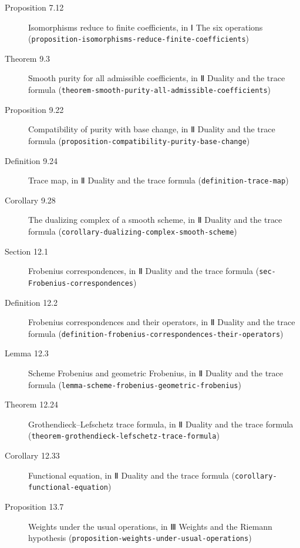 \documentclass[11pt]{article}
\newcommand{\bpslug}[1]{\texttt{#1}}
\begin{document}
\begin{description}
\item[Proposition 7.12] Isomorphisms reduce to finite coefficients, in Ⅰ The six operations (\bpslug{proposition-{}\allowbreak{}isomorphisms-{}\allowbreak{}reduce-{}\allowbreak{}finite-{}\allowbreak{}coefficients})
\item[Theorem 9.3] Smooth purity for all admissible coefficients, in Ⅱ Duality and the trace formula (\bpslug{theorem-{}\allowbreak{}smooth-{}\allowbreak{}purity-{}\allowbreak{}all-{}\allowbreak{}admissible-{}\allowbreak{}coefficients})
\item[Proposition 9.22] Compatibility of purity with base change, in Ⅱ Duality and the trace formula (\bpslug{proposition-{}\allowbreak{}compatibility-{}\allowbreak{}purity-{}\allowbreak{}base-{}\allowbreak{}change})
\item[Definition 9.24] Trace map, in Ⅱ Duality and the trace formula (\bpslug{definition-{}\allowbreak{}trace-{}\allowbreak{}map})
\item[Corollary 9.28] The dualizing complex of a smooth scheme, in Ⅱ Duality and the trace formula (\bpslug{corollary-{}\allowbreak{}dualizing-{}\allowbreak{}complex-{}\allowbreak{}smooth-{}\allowbreak{}scheme})
\item[Section 12.1] Frobenius correspondences, in Ⅱ Duality and the trace formula (\bpslug{sec-{}\allowbreak{}Frobenius-{}\allowbreak{}correspondences})
\item[Definition 12.2] Frobenius correspondences and their operators, in Ⅱ Duality and the trace formula (\bpslug{definition-{}\allowbreak{}frobenius-{}\allowbreak{}correspondences-{}\allowbreak{}their-{}\allowbreak{}operators})
\item[Lemma 12.3] Scheme Frobenius and geometric Frobenius, in Ⅱ Duality and the trace formula (\bpslug{lemma-{}\allowbreak{}scheme-{}\allowbreak{}frobenius-{}\allowbreak{}geometric-{}\allowbreak{}frobenius})
\item[Theorem 12.24] Grothendieck–Lefschetz trace formula, in Ⅱ Duality and the trace formula (\bpslug{theorem-{}\allowbreak{}grothendieck-{}\allowbreak{}lefschetz-{}\allowbreak{}trace-{}\allowbreak{}formula})
\item[Corollary 12.33] Functional equation, in Ⅱ Duality and the trace formula (\bpslug{corollary-{}\allowbreak{}functional-{}\allowbreak{}equation})
\item[Proposition 13.7] Weights under the usual operations, in Ⅲ Weights and the Riemann hypothesis (\bpslug{proposition-{}\allowbreak{}weights-{}\allowbreak{}under-{}\allowbreak{}usual-{}\allowbreak{}operations})

\end{description}
\end{document}
